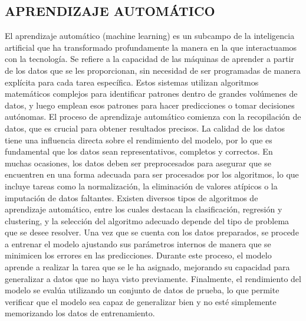 \subsection{APRENDIZAJE AUTOMÁTICO}

El aprendizaje automático (machine learning) es un subcampo de la inteligencia artificial
que ha transformado profundamente la manera en la que interactuamos con la tecnología. Se
refiere a la capacidad de las máquinas de aprender a partir de los datos que se les
proporcionan, sin necesidad de ser programadas de manera explícita para cada tarea
específica. Estos sistemas utilizan algoritmos matemáticos complejos para identificar
patrones dentro de grandes volúmenes de datos, y luego emplean esos patrones para hacer
predicciones o tomar decisiones autónomas.
El proceso de aprendizaje automático comienza con la recopilación de datos, que es crucial
para obtener resultados precisos. La calidad de los datos tiene una influencia directa
sobre el rendimiento del modelo, por lo que es fundamental que los datos sean
representativos, completos y correctos. En muchas ocasiones, los datos deben ser
preprocesados para asegurar que se encuentren en una forma adecuada para ser procesados
por los algoritmos, lo que incluye tareas como la normalización, la eliminación de valores
atípicos o la imputación de datos faltantes.
Existen diversos tipos de algoritmos de aprendizaje automático, entre los cuales destacan
la clasificación, regresión y clustering, y la selección del algoritmo adecuado depende
del tipo de problema que se desee resolver. Una vez que se cuenta con los datos
preparados, se procede a entrenar el modelo ajustando sus parámetros internos de manera
que se minimicen los errores en las predicciones. Durante este proceso, el modelo aprende
a realizar la tarea que se le ha asignado, mejorando su capacidad para generalizar a datos
que no haya visto previamente. Finalmente, el rendimiento del modelo se evalúa utilizando
un conjunto de datos de prueba, lo que permite verificar que el modelo sea capaz de
generalizar bien y no esté simplemente memorizando los datos de entrenamiento.

